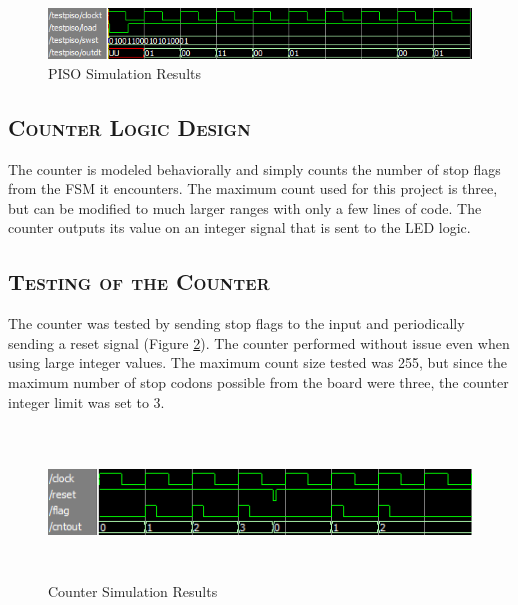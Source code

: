 \documentclass[11pt]{report}
\begin{document}
\begin{spacing}{1.5}
\vspace{15px}
\begin{figure}[H]
    \centering
    \includegraphics[width=1.0\textwidth,keepaspectratio]{piso.png}
    \caption{PISO Simulation Results}
    \label{fig:test_piso}
\end{figure}

\subsection{\scshape Counter Logic Design}
\label{sub:design_counter}

The counter is modeled behaviorally and simply counts the number of stop flags from the FSM it encounters.  The maximum count used for this project is three, but can be modified to much larger ranges with only a few lines of code.  The counter outputs its value on an integer signal that is sent to the LED logic.

\subsection{\scshape Testing of the Counter}
\label{sub:test_counter}

The counter was tested by sending stop flags to the input and periodically sending a reset signal (Figure \ref{fig:test_counter}).  The counter performed without issue even when using large integer values.  The maximum count size tested was 255, but since the maximum number of stop codons possible from the board were three, the counter integer limit was set to 3.

\vspace{15px}
\begin{figure}[H]
    \centering
    \includegraphics[width=1.0\textwidth,height=4cm,keepaspectratio]{counter.png}
    \caption{Counter Simulation Results\cite{Synth}}
    \label{fig:test_counter}
\end{figure}


\end{spacing}
\end{document}
